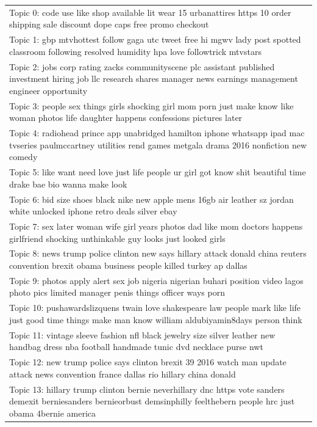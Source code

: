 \documentclass[11pt]{article}
\begin{document}
\begin{appendices}
\begin{table}
    \centering
    \begin{tabular}{|p{\linewidth}|}
    \hline
    Topic 0: code use like shop available lit wear 15 urbanattires https 10 order shipping sale discount dope caps free promo checkout\\
    Topic 1: gbp mtvhottest follow gaga utc tweet free hi mgwv lady post spotted classroom following resolved humidity hpa love followtrick mtvstars\\
    Topic 2: jobs corp rating zacks communityscene plc assistant published investment hiring job llc research shares manager news earnings management engineer opportunity\\
    Topic 3: people sex things girls shocking girl mom porn just make know like woman photos life daughter happens confessions pictures later\\
    Topic 4: radiohead prince app unabridged hamilton iphone whatsapp ipad mac tvseries paulmccartney utilities rend games metgala drama 2016 nonfiction new comedy\\
    Topic 5: like want need love just life people ur girl got know shit beautiful time drake bae bio wanna make look\\
    Topic 6: bid size shoes black nike new apple mens 16gb air leather sz jordan white unlocked iphone retro deals silver ebay\\
    Topic 7: sex later woman wife girl years photos dad like mom doctors happens girlfriend shocking unthinkable guy looks just looked girls\\
    Topic 8: news trump police clinton new says hillary attack donald china reuters convention brexit obama business people killed turkey ap dallas\\
    Topic 9: photos apply alert sex job nigeria nigerian buhari position video lagos photo pics limited manager penis things officer ways porn\\
    Topic 10: pushawardslizquens twain love shakespeare law people mark like life just good time things make man know william aldubiyamin8days person think\\
    Topic 11: vintage sleeve fashion nfl black jewelry size silver leather new handbag dress nba football handmade tunic dvd necklace purse nwt\\
    Topic 12: new trump police says clinton brexit 39 2016 watch man update attack news convention france dallas rio hillary china donald\\
    Topic 13: hillary trump clinton bernie neverhillary dnc https vote sanders demexit berniesanders bernieorbust demsinphilly feelthebern people hrc just obama 4bernie america\\

\end{tabular}
\end{table}
\end{appendices}
\end{document}
